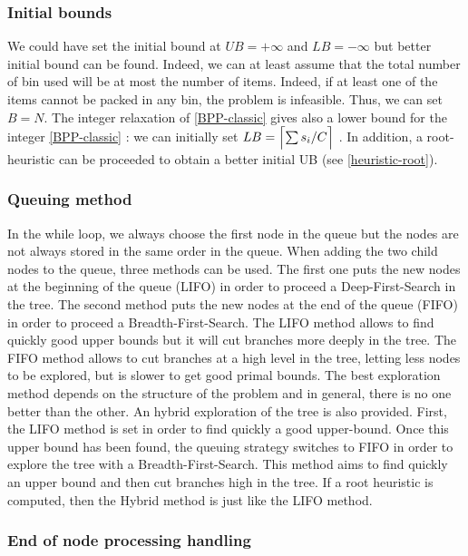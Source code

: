 \subsubsection{Initial bounds}

We could have set the initial bound at $UB = + \infty$ and $LB = -\infty$ but better initial bound can be found. Indeed, we can at least assume that the total number of bin used will be at most the number of items. Indeed, if at least one of the items cannot be packed in any bin, the problem is infeasible. Thus, we can set $B = N$. The integer relaxation of \eqref{BPP-classic} gives also a lower bound for the integer \eqref{BPP-classic} : we can initially set $LB = \ceil[\Big]{\sum s_i/C}$ \cite{sadykov2013bin}. In addition, a root-heuristic can be proceeded to obtain a better initial UB (see \ref{heuristic-root}).

\subsubsection{Queuing method}

In the while loop, we always choose the first node in the queue but the nodes are not always  stored in the same order in the queue. When adding the two child nodes to the queue, three methods can be used. The first one puts the new nodes at the beginning of the queue (LIFO) in order to proceed a Deep-First-Search in the tree. The second method puts the new nodes at the end of the queue (FIFO) in order to proceed a Breadth-First-Search. The LIFO method allows to find quickly good upper bounds but it will cut branches more deeply in the tree. The FIFO method allows to cut branches at a high level in the tree, letting less nodes to be explored, but is slower to get good primal bounds. The best exploration method depends on the structure of the problem and in general, there is no one better than the other. An hybrid exploration of the tree is also provided. First, the LIFO method is set in order to find quickly a good upper-bound. Once this upper bound has been found, the queuing strategy switches to FIFO in order to explore the tree with a Breadth-First-Search. This method aims to find quickly an upper bound and then cut branches high in the tree. If a root heuristic is computed, then the Hybrid method is just like the LIFO method. \\

\subsubsection{End of node processing handling}

